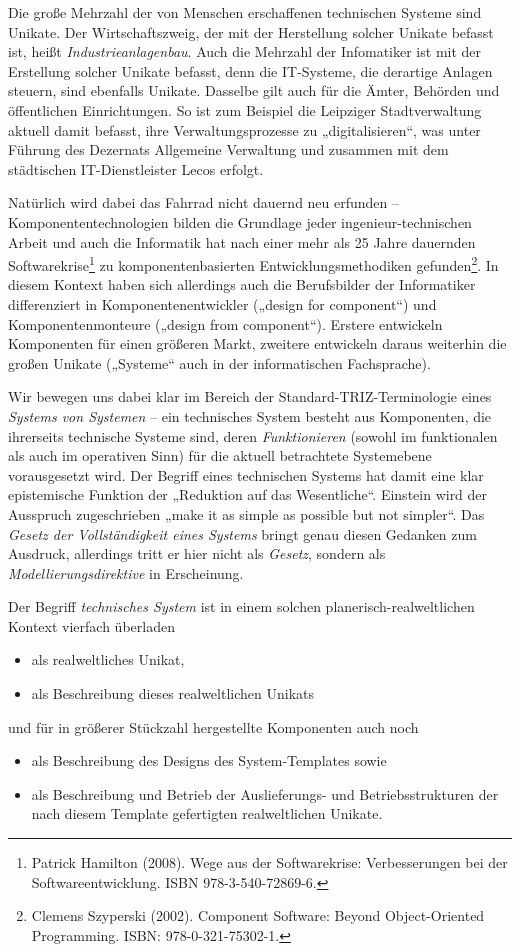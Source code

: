 \documentclass[11pt,a4paper]{article}
\begin{document}
Die große Mehrzahl der von Menschen erschaffenen technischen Systeme sind
Unikate. Der Wirtschaftszweig, der mit der Herstellung solcher Unikate befasst
ist, heißt \emph{Industrieanlagenbau}. Auch die Mehrzahl der Infomatiker ist
mit der Erstellung solcher Unikate befasst, denn die IT-Systeme, die derartige
Anlagen steuern, sind ebenfalls Unikate.  Dasselbe gilt auch für die Ämter,
Behörden und öffentlichen Einrichtungen. So ist zum Beispiel die Leipziger
Stadtverwaltung aktuell damit befasst, ihre Verwaltungsprozesse zu
„digitalisieren“, was unter Führung des Dezernats Allgemeine Verwaltung und
zusammen mit dem städtischen IT-Dienstleister Lecos erfolgt.

Natürlich wird dabei das Fahrrad nicht dauernd neu erfunden --
Komponententechnologien bilden die Grundlage jeder ingenieur-technischen
Arbeit und auch die Informatik hat nach einer mehr als 25 Jahre dauernden
Softwarekrise\footnote{Patrick Hamilton (2008). Wege aus der Softwarekrise:
  Verbesserungen bei der Softwareentwicklung. ISBN 978-3-540-72869-6.} zu
komponentenbasierten Entwicklungsmethodiken gefunden\footnote{Clemens
  Szyperski (2002). Component Software: Beyond Object-Oriented
  Programming. ISBN: 978-0-321-75302-1.}.  In diesem Kontext haben sich
allerdings auch die Berufsbilder der Informatiker differenziert in
Komponentenentwickler („design for component“) und Komponentenmonteure
(„design from component“).  Erstere entwickeln Komponenten für einen größeren
Markt, zweitere entwickeln daraus weiterhin die großen Unikate („Systeme“ auch
in der informatischen Fachsprache).

Wir bewegen uns dabei klar im Bereich der Standard-TRIZ-Terminologie eines
\emph{Systems von Systemen} -- ein technisches System besteht aus Komponenten,
die ihrerseits technische Systeme sind, deren \emph{Funktionieren} (sowohl im
funktionalen als auch im operativen Sinn) für die aktuell betrachtete
Systemebene vorausgesetzt wird. Der Begriff eines technischen Systems hat
damit eine klar epistemische Funktion der „Reduktion auf das Wesentliche“.
Einstein wird der Ausspruch zugeschrieben „make it as simple as possible but
not simpler“. Das \emph{Gesetz der Vollständigkeit eines Systems} bringt genau
diesen Gedanken zum Ausdruck, allerdings tritt er hier nicht als
\emph{Gesetz}, sondern als \emph{Modellierungsdirektive} in Erscheinung.

Der Begriff \emph{technisches System} ist in einem solchen
planerisch-realweltlichen Kontext vierfach überladen
\begin{itemize}
\item [1.] als realweltliches Unikat,
\item [2.] als Beschreibung dieses realweltlichen Unikats
\end{itemize}
und für in größerer Stückzahl hergestellte Komponenten auch noch
\begin{itemize}
\item [3.] als Beschreibung des Designs des System-Templates sowie
\item [4.] als Beschreibung und Betrieb der Auslieferungs- und
  Betriebsstrukturen der nach diesem Template gefertigten realweltlichen
  Unikate.
\end{itemize}
\end{document}
